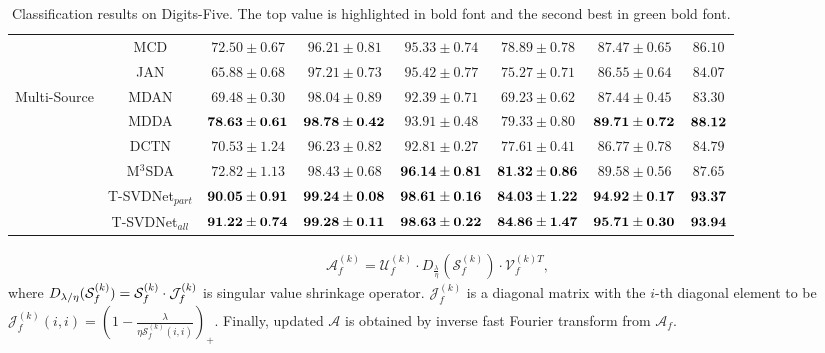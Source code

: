 \documentclass[10pt,twocolumn,letterpaper]{article}
\begin{document}
\begin{table*}[h]
\begin{center}
{\begin{tabular}{lccccccc}
				& MCD               & $72.50\pm 0.67$ & $96.21\pm 0.81$ & $95.33\pm 0.74$ & $78.89\pm 0.78$ & $87.47\pm 0.65$ & $86.10$      \\
				& JAN               & $65.88\pm 0.68$ & $97.21\pm 0.73$ & $95.42\pm 0.77$ & $75.27\pm 0.71$ & $86.55\pm 0.64$ & $84.07$     \\ \hline 
				\multicolumn{1}{c}{\multirow{6}{*}{Multi-Source}}                    & MDAN              & $69.48\pm 0.30$ & $98.04 \pm 0.89$ & $92.39\pm 0.71$ & $69.23\pm 0.62$ & $87.44\pm 0.45$ & $83.30$      \\
				& MDDA              & {\color{green}$\bf 78.63\pm 0.61$} & {\color{green}$\bf 98.78\pm 0.42$} & $93.91\pm 0.48$ & $79.33\pm 0.80$ & {\color{green}$\bf 89.71\pm 0.72$} & {\color{green}$\bf88.12 $}     \\
				& DCTN              & $70.53\pm 1.24$ & $96.23\pm 0.82$ & $92.81\pm 0.27$ & $77.61\pm 0.41$ & $86.77\pm 0.78$ & $84.79$      \\
				& M$^3$SDA             & $72.82\pm 1.13$ & $98.43\pm 0.68$ & {\color{green}$\bf96.14\pm 0.81$} & {\color{green}$\bf81.32\pm 0.86$} & $89.58\pm 0.56$ & $87.65$      \\
& T-SVDNet$_{part}$ & {\color{blue}$\bf{90.05\pm0.91}$}      & {\color{blue}$\bf99.24\pm0.08$}      & {\color{blue}$\bf98.61\pm0.16 $}      & {\color{blue}$\bf84.03\pm1.22$}      & {\color{blue}$\bf94.92\pm0.17$}      & {\color{blue}$\bf93.37$}      \\
				& T-SVDNet$_{all}$          & {\color{blue}$\bf91.22\pm0.74$}     & {\color{blue}$\bf99.28\pm0.11$}      & {\color{blue}$\bf98.63\pm0.22 $}            & {\color{blue}$\bf84.86\pm1.47$}      & {\color{blue}$\bf95.71\pm0.30$}      & {\color{blue}$\bf93.94$}           \\
				\bottomrule[1.5pt]
			\end{tabular}
		}	
	\end{center}
	\caption{{\small{Classification results on Digits-Five. The top value is highlighted in {\color{blue}{blue}} bold font and the second best in {\color{green} green} bold font.}}}
	\label{tab1}
\end{table*}
\begin{align}
	\mathcal{A}_f^{(k)}=\mathcal{U}_f^{(k)}\cdot D_{\frac{\lambda}{\eta}}( \mathcal{S}_f^{(k)})\cdot\mathcal{V}_f^{(k)T},
\end{align}
where {\small{${\small D_{{\lambda}/{\eta}}(\mathcal{S}_f^{(k)})=\mathcal{S}_f^{(k)}\cdot \mathcal{J}_f^{(k)}}$}} is singular value shrinkage operator. {\small{$\mathcal{J}_f^{(k)}$}} is a diagonal matrix with the $i$-th diagonal element to be {\small$\mathcal{J}_{f}^{(k)}(i,i)=(1-\frac{\lambda}{\eta\mathcal{S}_{f}^{(k)}(i,i)})_+$}. Finally, updated $\mathcal{A}$ is obtained by inverse fast Fourier transform from $\mathcal{A}_f$.
\end{document}

